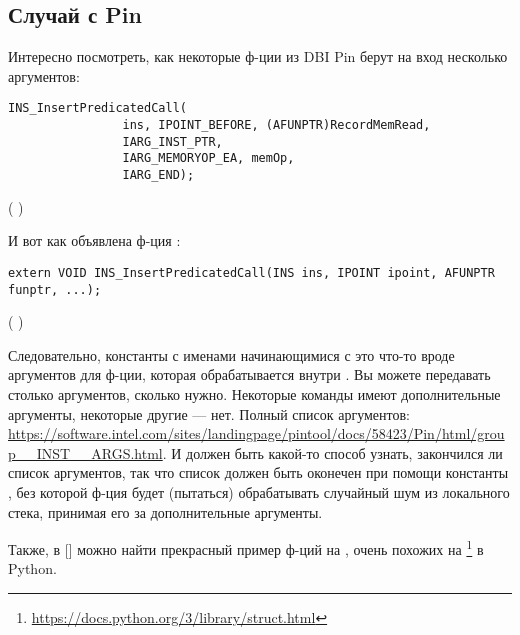 \subsection{Случай с Pin}

Интересно посмотреть, как некоторые ф-ции из \ac{DBI} Pin берут на вход несколько аргументов:

\begin{lstlisting}[style=customc]
            INS_InsertPredicatedCall(
                ins, IPOINT_BEFORE, (AFUNPTR)RecordMemRead,
                IARG_INST_PTR,
                IARG_MEMORYOP_EA, memOp,
                IARG_END);
\end{lstlisting}
(  )

И вот как объявлена ф-ция :

\begin{lstlisting}[style=customc]
extern VOID INS_InsertPredicatedCall(INS ins, IPOINT ipoint, AFUNPTR funptr, ...);
\end{lstlisting}
(  )

Следовательно, константы с именами начинающимися с  это что-то вроде аргументов для ф-ции,
которая обрабатывается внутри .
Вы можете передавать столько аргументов, сколько нужно.
Некоторые команды имеют дополнительные аргументы, некоторые другие --- нет.
Полный список аргументов:
\url{https://software.intel.com/sites/landingpage/pintool/docs/58423/Pin/html/group__INST__ARGS.html}.
И должен быть какой-то способ узнать, закончился ли список аргументов, так что список должен быть оконечен при помощи
константы , без которой ф-ция будет (пытаться) обрабатывать случайный шум из локального стека,
принимая его за дополнительные аргументы.

Также, в [\RobPikePractice] можно найти прекрасный пример ф-ций на \CCpp{}, очень похожих на 
\footnote{\url{https://docs.python.org/3/library/struct.html}} в Python.

